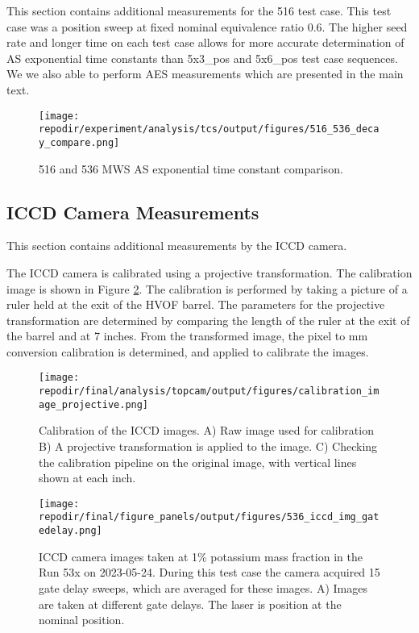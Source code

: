 This section contains additional measurements for the 516 test case. This test case was a position sweep at fixed nominal equivalence ratio 0.6. The higher seed rate and longer time on each test case allows for more accurate determination of AS exponential time constants than 5x3\_pos and 5x6\_pos test case sequences. We we also able to perform AES measurements which are presented in the main text. 


\begin{figure}[]
\centering
\texttt{[image: \\repodir/experiment/analysis/tcs/output/figures/516\_536\_decay\_compare.png]}
\caption{516 and 536 MWS AS exponential time constant comparison.}
\label{fig:SI_516_mws_decaytime}
\end{figure}


\clearpage
\subsection{ICCD Camera Measurements}

This section contains additional measurements by the ICCD camera. 

The ICCD camera is calibrated using a projective transformation. The calibration image is shown in Figure \ref{fig:SI_iccd_calibration}. The calibration is performed by taking a picture of a ruler held at the exit of the HVOF barrel. The parameters for the projective transformation are determined by comparing the length of the ruler at the exit of the barrel and at 7 inches. From the transformed image, the pixel to mm conversion calibration is determined, and applied to calibrate the images. 

\begin{figure}[]
\centering
\texttt{[image: \\repodir/final/analysis/topcam/output/figures/calibration\_image\_projective.png]}
\caption{Calibration of the ICCD images. A) Raw image used for calibration B) A projective transformation is applied to the image. C) Checking the calibration pipeline on the original image, with vertical lines shown at each inch.}
\label{fig:SI_iccd_calibration}
\end{figure}

\begin{figure}
    \centering
    \texttt{[image: \\repodir/final/figure\_panels/output/figures/536\_iccd\_img\_gatedelay.png]} 
    \caption{ICCD camera images taken at 1\% potassium mass fraction in the Run 53x on 2023-05-24. During this test case the camera acquired 15 gate delay sweeps, which are averaged for these images. A) Images are taken at different gate delays. The laser is position at the nominal position. }
    \label{fig:SI_536_iccd}
\end{figure}


